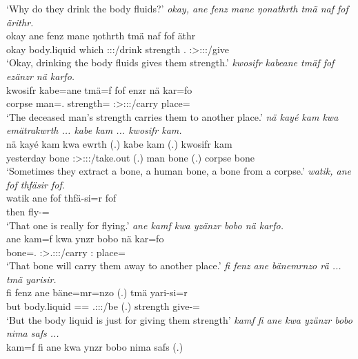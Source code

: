 \begin{exe}
	\trans `Why do they drink the body fluids?'
	\emph{okay, ane fenz mane ŋonathrth tmä naf fof ärithr.}\\
	\gll okay ane fenz mane ŋothrth tmä naf fof äthr\\
	okay \Dem{} body.liquid which \Stpl:\Sbj:\Nonpast:\Ipfv/drink strength \Tsg.\Erg{} \Emph{} \Stsg:\Sbj>\Stpl:\Io:\Nonpast:\Ipfv/give\\
	\trans `Okay, drinking the body fluids gives them strength.'
	\emph{kwosifr kabeane tmäf fof ezänzr nä karfo.}\\
	\gll kwosifr kabe=ane tmä=f fof enzr nä kar=fo\\
	corpse man=\Poss.\Sg{} strength=\Erg{} \Emph{} \Stsg:\Sbj>\Stpl:\Obj:\Nonpast:\Ipfv/carry \Indf{} place=\All\\
	\trans `The deceased man's strength carries them to another place.'
	\emph{nä kayé kam kwa emätrakwrth ... kabe kam ... kwosifr kam.}\\
	\gll nä kayé kam kwa ewrth (.) kabe kam (.) kwosifr kam\\
	\Indf{} yesterday bone \Fut{} \Stpl:\Sbj>\Stpl:\Obj:\Nonpast:\Ipfv/take.out (.) man bone (.) corpse bone\\
	\trans `Sometimes they extract a bone, a human bone, a bone from a corpse.'
	\emph{watik, ane fof thfäsir fof.}\\
	\gll watik ane fof thfä-si=r fof\\
	then \Dem{} \Emph{} fly-\Nmlz=\Purp{} \Emph{}\\
	\trans `That one is really for flying.'
	\emph{ane kamf kwa yzänzr bobo nä karfo.}\\
	\gll ane kam=f kwa ynzr bobo nä kar=fo\\
	\Dem{} bone=\Erg.\Sg{} \Fut{} \Stsg:\Sbj>\Tsg.\Masc:\Obj:\Nonpast:\Ipfv/carry \Med:\All{} \Indf{} place=\All\\
	\trans `That bone will carry them away to another place.'
	\emph{fi fenz ane bänemrnzo rä ... tmä yarisir.}\\
	\gll fi fenz ane bäne=mr=nzo  (.) tmä yari-si=r\\
	but body.liquid \Dem{} \Recog=\Purp=\Only{} \Tsg.\F:\Sbj:\Nonpast:\Ipfv/be (.) strength give-\Nmlz=\Purp\\
	\trans `But the body liquid is just for giving them strength'
	\emph{kamf fi ane kwa yzänzr bobo nima safs ...}\\
	\gll kam=f fi ane kwa ynzr bobo nima safs (.)\\

\end{exe}
